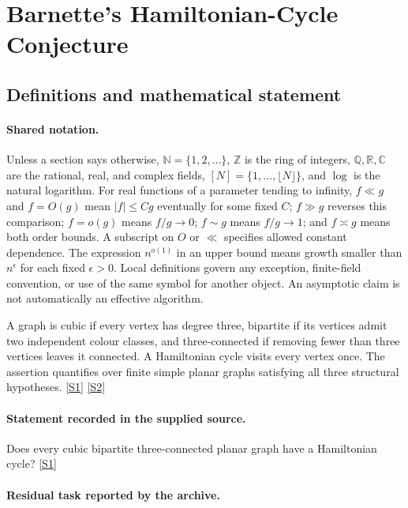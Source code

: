 \documentclass[11pt,a4paper]{article}
\newcommand{\N}{\mathbb{N}}
\newcommand{\Z}{\mathbb{Z}}
\newcommand{\Q}{\mathbb{Q}}
\newcommand{\R}{\mathbb{R}}
\newcommand{\C}{\mathbb{C}}
\newcommand{\sref}[2]{\hyperlink{source:#1:#2}{[S#2]}}
\begin{document}
\section{Barnette’s Hamiltonian-Cycle Conjecture}\label{statement}


\subsection{Definitions and mathematical statement}

\paragraph{Shared notation.}Unless a section says otherwise, $\N=\{1,2,\ldots\}$,
$\Z$ is the ring of integers, $\Q,\R,\C$ are the rational, real, and complex
fields, $[N]=\{1,\ldots,\lfloor N\rfloor\}$, and $\log$ is the natural
logarithm. For real functions of a parameter tending to infinity,
$f\ll g$ and $f=O(g)$ mean $|f|\leq Cg$ eventually for some fixed $C$;
$f\gg g$ reverses this comparison; $f=o(g)$ means $f/g\to0$;
$f\sim g$ means $f/g\to1$; and $f\asymp g$ means both order bounds.
A subscript on $O$ or $\ll$ specifies allowed constant dependence.
The expression $n^{o(1)}$ in an upper bound means growth smaller than
$n^\epsilon$ for each fixed $\epsilon>0$. Local definitions govern any
exception, finite-field convention, or use of the same symbol for another
object. An asymptotic claim is not automatically an effective algorithm.



A graph is cubic if every vertex has degree three, bipartite if its vertices admit two independent colour classes, and three-connected if removing fewer than three vertices leaves it connected. A Hamiltonian cycle visits every vertex once. The assertion quantifies over finite simple planar graphs satisfying all three structural hypotheses. \sref{statement}{1} \sref{statement}{2}

\paragraph{Statement recorded in the supplied source.}
Does every cubic bipartite three-connected planar graph have a Hamiltonian cycle? \sref{statement}{1}

\paragraph{Residual task reported by the archive.}
\end{document}
